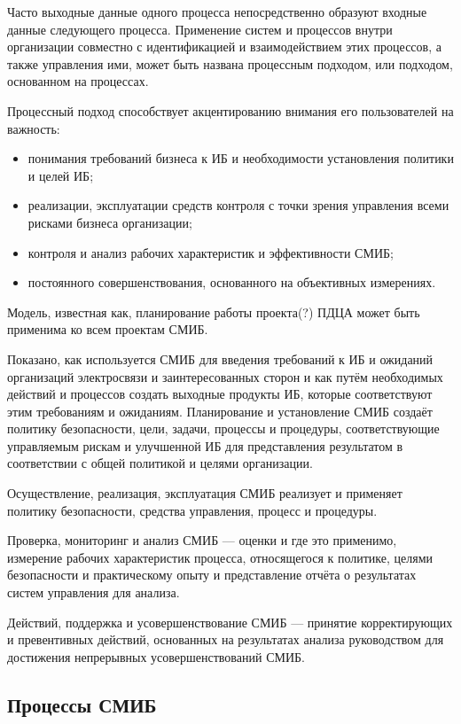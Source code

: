 \documentclass[12pt, russian, oneside, article]{ncc}
\begin{document}
Часто выходные данные одного процесса непосредственно образуют входные данные следующего процесса. Применение систем и процессов внутри организации совместно с идентификацией и взаимодействием этих процессов, а также управления ими, может быть названа процессным подходом, или подходом, основанном на процессах.

Процессный подход способствует акцентированию внимания его пользователей на важность:
\begin{itemize}
\item понимания требований бизнеса к ИБ и необходимости установления политики и целей ИБ;
\item реализации, эксплуатации средств контроля с точки зрения управления всеми рисками бизнеса организации;
\item контроля и анализ рабочих характеристик и эффективности СМИБ;
\item постоянного совершенствования, основанного на объективных измерениях.
\end{itemize}

Модель, известная как, планирование работы проекта(?) ПДЦА может быть применима ко всем проектам СМИБ.

Показано, как используется СМИБ для введения требований к ИБ и ожиданий организаций электросвязи и заинтересованных сторон и как путём необходимых действий и процессов создать выходные продукты ИБ, которые соответствуют этим требованиям и ожиданиям. Планирование и установление СМИБ создаёт политику безопасности, цели, задачи, процессы и процедуры, соответствующие управляемым рискам и улучшенной ИБ для представления результатом в соответствии с общей политикой и целями организации.

Осуществление, реализация, эксплуатация СМИБ реализует и применяет политику безопасности, средства управления, процесс и процедуры. 

Проверка, мониторинг и анализ СМИБ --- оценки и где это применимо, измерение рабочих характеристик процесса, относящегося к политике, целями безопасности и практическому опыту и представление отчёта о результатах систем управления для анализа.

Действий, поддержка и усовершенствование СМИБ --- принятие корректирующих и превентивных действий, основанных на результатах анализа руководством для достижения непрерывных усовершенствований СМИБ.
\subsection{Процессы СМИБ}
\label{sec-4_2}
\end{document}
